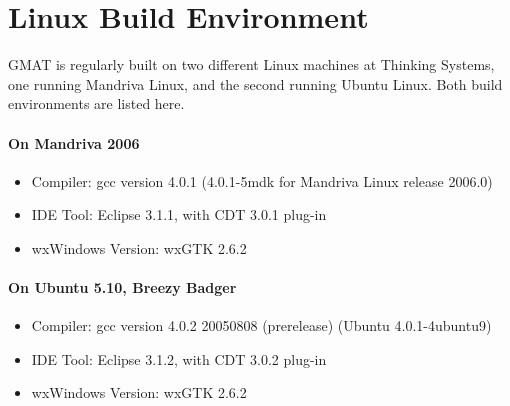\section{Linux Build Environment}

GMAT is regularly built on two different Linux machines at Thinking Systems, one running Mandriva
Linux, and the second running Ubuntu Linux.  Both build environments are listed here.

\paragraph{On Mandriva 2006}
\begin{itemize}
   \item Compiler: gcc version 4.0.1 (4.0.1-5mdk for Mandriva Linux release 2006.0)
   \item IDE Tool: Eclipse 3.1.1, with CDT 3.0.1 plug-in
   \item wxWindows Version: wxGTK 2.6.2
\end{itemize}

\paragraph{On Ubuntu 5.10, Breezy Badger}
\begin{itemize}
   \item Compiler: gcc version 4.0.2 20050808 (prerelease) (Ubuntu
4.0.1-4ubuntu9)
   \item IDE Tool: Eclipse 3.1.2, with CDT 3.0.2 plug-in
   \item wxWindows Version: wxGTK 2.6.2
\end{itemize}
